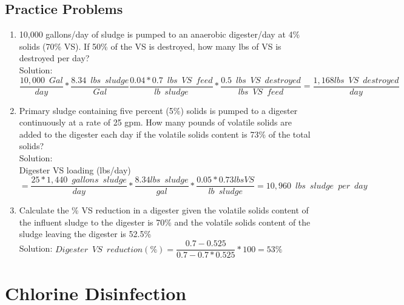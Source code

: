 \documentclass{article}
\begin{document}
\subsection{Practice Problems} 

\begin{enumerate}

\item 10,000 gallons/day of sludge is pumped to an anaerobic digester/day at 4\% solids (70\% VS).  If 50\% of the VS is destroyed, how many lbs of VS is destroyed per day?\\
Solution:\\
$\dfrac{10,000 \enspace Gal}{day}*\dfrac{8.34 \enspace lbs \enspace sludge}{Gal} \dfrac{0.04*0.7 \enspace lbs \enspace VS \enspace feed}{lb \enspace sludge}*\dfrac{0.5 \enspace lbs \enspace VS \enspace destroyed}{lbs \enspace VS \enspace feed}=\boxed{\dfrac{1,168lbs \enspace VS \enspace destroyed}{day} } $


\item Primary sludge containing five percent (5\%) solids is pumped to a digester continuously at a rate of 25 gpm. How many pounds of volatile solids are added to the digester each day if the volatile solids content is 73\% of the total solids?\\
Solution:\\
Digester VS loading (lbs/day)\\$=\dfrac{25*1,440 \enspace gallons \enspace sludge}{day}*\dfrac{8.34lbs \enspace sludge}{gal}*\dfrac{0.05*0.73lbs VS}{lb \enspace sludge}=\boxed{10,960 \enspace lbs \enspace sludge \enspace per \enspace day}$\\


\item Calculate the \% VS reduction in a digester given the volatile solids content of the influent sludge to the digester is 70\% and the volatile solids content of the sludge leaving the digester is 52.5\%\\
Solution:  $Digester \enspace VS \enspace reduction (\%)=\dfrac{0.7-0.525}{0.7-0.7*0.525}*100=\boxed{ 53\%}$\\

\end{enumerate}

\newpage
\section{Chlorine Disinfection}
\end{document}
